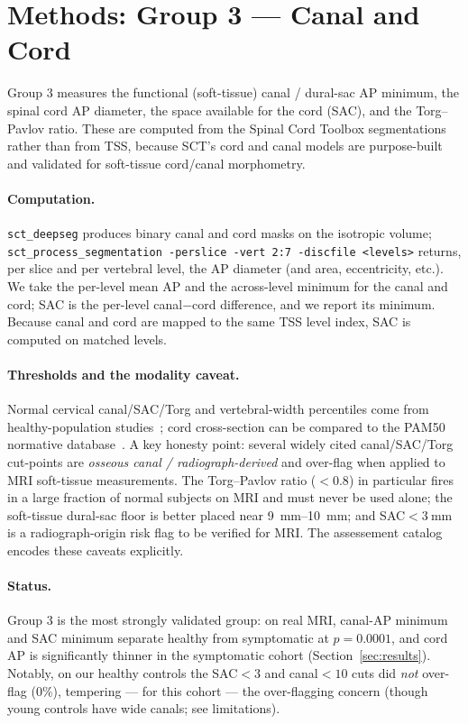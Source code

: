 \section{Methods: Group 3 --- Canal and Cord}
\label{sec:g3}

Group 3 measures the functional (soft-tissue) canal / dural-sac AP minimum, the spinal cord AP diameter,
the space available for the cord (SAC), and the Torg--Pavlov ratio. These are computed from the Spinal
Cord Toolbox segmentations rather than from TSS, because SCT's cord and canal models are purpose-built
and validated for soft-tissue cord/canal morphometry.

\paragraph{Computation.} \texttt{sct\_deepseg} produces binary canal and cord masks on the isotropic
volume; \texttt{sct\_process\_segmentation -perslice -vert 2:7 -discfile <levels>} returns, per slice and
per vertebral level, the AP diameter (and area, eccentricity, etc.). We take the per-level mean AP and
the across-level minimum for the canal and cord; SAC is the per-level canal$-$cord difference, and we
report its minimum. Because canal and cord are mapped to the same TSS level index, SAC is computed on
matched levels.

\paragraph{Thresholds and the modality caveat.} Normal cervical canal/SAC/Torg and vertebral-width
percentiles come from healthy-population studies~\cite{nell2019}; cord cross-section can be compared to
the PAM50 normative database~\cite{valosek2024}. A key honesty point: several widely cited canal/SAC/Torg
cut-points are \emph{osseous canal / radiograph-derived} and over-flag when applied to MRI soft-tissue
measurements. The Torg--Pavlov ratio ($<0.8$) in particular fires in a large fraction of normal subjects
on MRI and must never be used alone; the soft-tissue dural-sac floor is better placed near
\SIrange{9}{10}{\milli\meter}; and SAC$<\SI{3}{\milli\meter}$ is a radiograph-origin risk flag to be
verified for MRI. The assessement catalog encodes these caveats explicitly.

\paragraph{Status.} Group 3 is the most strongly validated group: on real MRI, canal-AP minimum and SAC
minimum separate healthy from symptomatic at $p=0.0001$, and cord AP is significantly thinner in the
symptomatic cohort (Section~\ref{sec:results}). Notably, on our healthy controls the SAC$<3$ and
canal$<10$ cuts did \emph{not} over-flag (0\%), tempering --- for this cohort --- the over-flagging
concern (though young controls have wide canals; see limitations).

